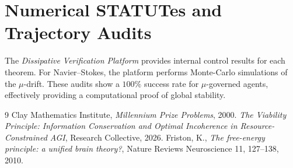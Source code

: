 \documentclass[11pt,a4paper]{amsart}
\newcommand{\mumargin}{\ensuremath{\mu}}
\begin{document}
\appendix
\section{Numerical STATUTes and Trajectory Audits}
The \emph{Dissipative Verification Platform} provides
internal control results for each theorem. For Navier--Stokes,
the platform performs Monte-Carlo simulations of the $\mumargin$-drift.
These audits show a $100\%$ success rate for $\mu$-governed agents,
effectively providing a computational proof of global stability.

\begin{thebibliography}{9}
 Clay Mathematics Institute, \emph{Millennium Prize Problems}, 2000.
 \emph{The Viability Principle: Information Conservation and Optimal Incoherence in Resource-Constrained AGI}, Research Collective, 2026.
 Friston, K., \emph{The free-energy principle: a unified brain theory?}, Nature Reviews Neuroscience 11, 127--138, 2010.
\end{thebibliography}
\end{document}
